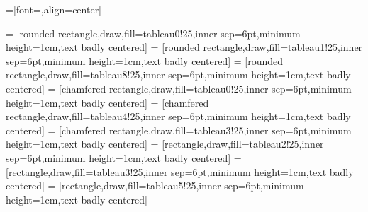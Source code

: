 



=[font=\sffamily,align=center]

\newcommand{\fillOpacity}{25}

\newcommand{\compShape}{rectangle}
\newcommand{\groupShape}{chamfered rectangle}
\newcommand{\procShape}{rounded rectangle}

 = [\procShape,draw,fill=tableau0!\fillOpacity,inner sep=6pt,minimum height=1cm,text badly centered]
 = [\procShape,draw,fill=tableau1!\fillOpacity,inner sep=6pt,minimum height=1cm,text badly centered]
 = [\procShape,draw,fill=tableau8!\fillOpacity,inner sep=6pt,minimum height=1cm,text badly centered]
 = [\groupShape,draw,fill=tableau0!\fillOpacity,inner sep=6pt,minimum height=1cm,text badly centered]
 = [\groupShape,draw,fill=tableau4!\fillOpacity,inner sep=6pt,minimum height=1cm,text badly centered]
 = [\groupShape,draw,fill=tableau3!\fillOpacity,inner sep=6pt,minimum height=1cm,text badly centered]
 = [\compShape,draw,fill=tableau2!\fillOpacity,inner sep=6pt,minimum height=1cm,text badly centered]
 = [\compShape,draw,fill=tableau3!\fillOpacity,inner sep=6pt,minimum height=1cm,text badly centered]
 = [\compShape,draw,fill=tableau5!\fillOpacity,inner sep=6pt,minimum height=1cm,text badly centered]

